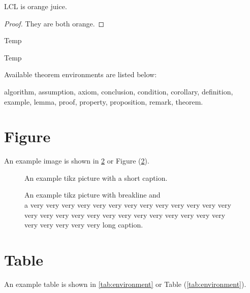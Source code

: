 \begin{definition}
  LCL is orange juice.
\end{definition}

\begin{proof}
  They are both orange.
\end{proof}

\begin{algorithm}[htbp]
  \caption{Temp}
  \begin{algorithmic}[1]
    \STATE Temp
  \end{algorithmic}
\end{algorithm}

Available theorem environments are listed below:

algorithm, assumption, axiom, conclusion, condition, corollary, definition, example, lemma, proof, property, proposition, remark, theorem.

\section{Figure}
An example image is shown in \cref{fig:tikz example} or Figure (\ref{fig:tikz example}).

\begin{figure}[H]
  \centering
  \caption{An example tikz picture with a short caption.}
  \label{fig:tikz example short}
\end{figure}

\begin{figure}[H]
  \centering
  \caption{An example tikz picture with breakline and\\ a very very very very very very very very very very very very very very very very very very very very very very very very very very very very very very very long caption.}
  \label{fig:tikz example}
\end{figure}

\section{Table}

An example table is shown in \cref{tab:environment} or Table (\ref{tab:environment}).

